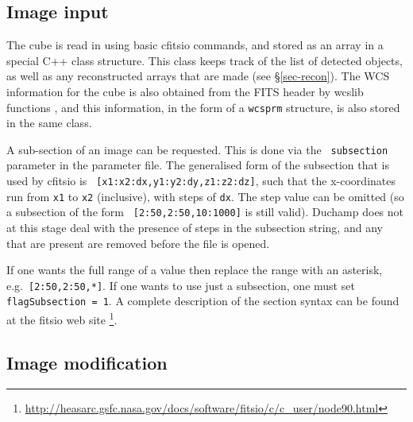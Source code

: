 \documentclass[12pt]{article}
\newcommand{\eg}{e.g.\ }
\begin{document}
%

\subsection{Image input}

The cube is read in using basic {\sc cfitsio} commands, and stored as
an array in a special C++ class structure. This class keeps track of
the list of detected objects, as well as any reconstructed arrays that
are made (see \S\ref{sec-recon}). The WCS information for the cube is
also obtained from the FITS header by {\sc wcslib} functions
\citep{greisen02, calabretta02}, and this information, in the form of
a {\tt wcsprm} structure, is also stored in the same class.

A sub-section of an image can be requested. This is done via the {\tt
subsection} parameter in the parameter file. The generalised form of
the subsection that is used by {\sc cfitsio} is {\tt
[x1:x2:dx,y1:y2:dy,z1:z2:dz]}, such that the x-coordinates run from
{\tt x1} to {\tt x2} (inclusive), with steps of {\tt dx}. The step
value can be omitted (so a subsection of the form {\tt
[2:50,2:50,10:1000]} is still valid). Duchamp does not at this
stage deal with the presence of steps in the subsection string, and
any that are present are removed before the file is opened.

If one wants the full range of a value then replace the range with an
asterisk, \eg {\tt [2:50,2:50,*]}. If one wants to use just a
subsection, one must set {\tt flagSubsection = 1}. A complete
description of the section syntax can be found at the {\sc fitsio} web
site
\footnote{
\href{http://heasarc.gsfc.nasa.gov/docs/software/fitsio/c/c\_user/node90.html}%
{http://heasarc.gsfc.nasa.gov/docs/software/fitsio/c/c\_user/node90.html}}.

\subsection{Image modification}
\label{sec-modify}
\end{document}
